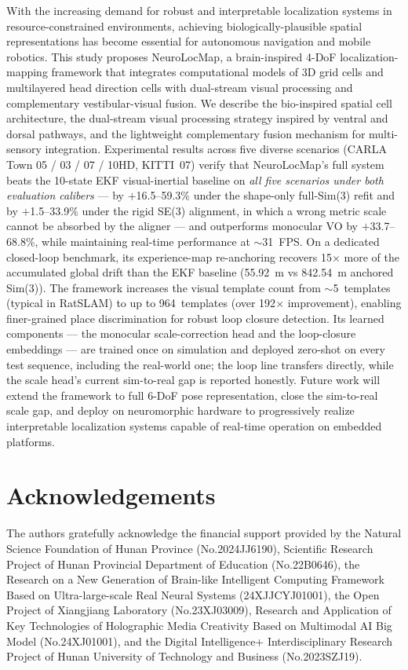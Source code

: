 \documentclass[5p,times]{elsarticle}
\begin{document}
With the increasing demand for robust and interpretable localization systems in resource-constrained environments, achieving biologically-plausible spatial representations has become essential for autonomous navigation and mobile robotics. This study proposes NeuroLocMap, a brain-inspired 4-DoF localization-mapping framework that integrates computational models of 3D grid cells and multilayered head direction cells with dual-stream visual processing and complementary vestibular-visual fusion. We describe the bio-inspired spatial cell architecture, the dual-stream visual processing strategy inspired by ventral and dorsal pathways, and the lightweight complementary fusion mechanism for multi-sensory integration. Experimental results across five diverse scenarios (CARLA Town 05 / 03 / 07 / 10HD, KITTI~07) verify that NeuroLocMap's full system beats the 10-state EKF visual-inertial baseline on \emph{all five scenarios under both evaluation calibers} --- by $+$16.5--59.3\% under the shape-only full-Sim(3) refit and by $+$1.5--33.9\% under the rigid SE(3) alignment, in which a wrong metric scale cannot be absorbed by the aligner --- and outperforms monocular VO by $+$33.7--68.8\%, while maintaining real-time performance at $\sim$31~FPS. On a dedicated closed-loop benchmark, its experience-map re-anchoring recovers 15$\times$ more of the accumulated global drift than the EKF baseline (55.92~m vs 842.54~m anchored Sim(3)). The framework increases the visual template count from $\sim$5~templates (typical in RatSLAM) to up to 964~templates (over 192$\times$ improvement), enabling finer-grained place discrimination for robust loop closure detection. Its learned components --- the monocular scale-correction head and the loop-closure embeddings --- are trained once on simulation and deployed zero-shot on every test sequence, including the real-world one; the loop line transfers directly, while the scale head's current sim-to-real gap is reported honestly. Future work will extend the framework to full 6-DoF pose representation, close the sim-to-real scale gap, and deploy on neuromorphic hardware to progressively realize interpretable localization systems capable of real-time operation on embedded platforms.

\section*{Acknowledgements}

The authors gratefully acknowledge the financial support provided by the Natural Science Foundation of Hunan Province (No.2024JJ6190), Scientific Research Project of Hunan Provincial Department of Education (No.22B0646), the Research on a New Generation of Brain-like Intelligent Computing Framework Based on Ultra-large-scale Real Neural Systems (24XJJCYJ01001), the Open Project of Xiangjiang Laboratory (No.23XJ03009), Research and Application of Key Technologies of Holographic Media Creativity Based on Multimodal AI Big Model (No.24XJ01001), and the Digital Intelligence+ Interdisciplinary Research Project of Hunan University of Technology and Business (No.2023SZJ19).
\end{document}
